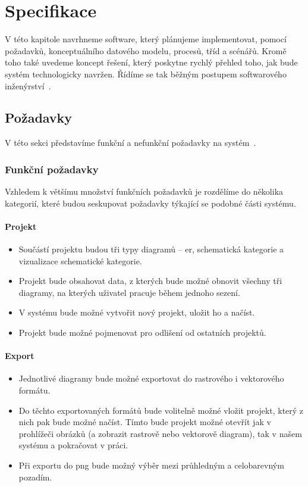 \chapter{Specifikace}\label{chapter:specifikace}

V této kapitole navrhneme software, který plánujeme implementovat, pomocí požadavků, konceptuálního datového modelu, procesů, tříd a scénářů.
Kromě toho také uvedeme koncept řešení, který poskytne rychlý přehled toho, jak bude systém technologicky navržen.
Řídíme se tak běžným postupem softwarového inženýrství~\cite{sommerville_softwareengineering_2011}.

\section{Požadavky}

V této sekci představíme funkční a nefunkční požadavky na systém~\cite[s.~83]{sommerville_softwareengineering_2011}.

\subsection{Funkční požadavky}
Vzhledem k většímu množství funkčních požadavků je rozdělíme do několika kategorií, které budou seskupovat požadavky týkající se podobné části systému.

\subsubsection*{Projekt}
\begin{itemize}
  \item Součástí projektu budou tři typy diagramů -- \acrshort{er}, schematická kategorie a vizualizace schematické kategorie.
  \item Projekt bude obsahovat data, z kterých bude možné obnovit všechny tři diagramy, na kterých uživatel pracuje během jednoho sezení.
  \item V systému bude možné vytvořit nový projekt, uložit ho a načíst.
  \item Projekt bude možné pojmenovat pro odlišení od ostatních projektů.
\end{itemize}

\subsubsection*{Export}
\begin{itemize}
  \item Jednotlivé diagramy bude možné exportovat do rastrového i vektorového formátu.
  \item Do těchto exportovaných formátů bude volitelně možné vložit projekt, který z nich pak bude možné načíst.
        Tímto bude projekt možné otevřít jak v prohlížeči obrázků (a zobrazit rastrově nebo vektorově diagram), tak v našem systému a pokračovat v práci.
  \item Při exportu do \acrshort{png} bude možný výběr mezi průhledným a celobarevným pozadím.
\end{itemize}

